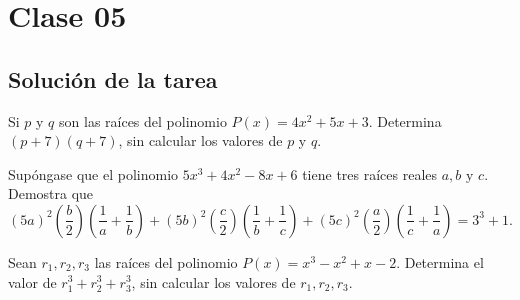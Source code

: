 \section{Clase 05}\label{sec:clase-05}

    \subsection{Solución de la tarea}
    \begin{section-problem}
        Si $p$ y $q$ son las raíces del polinomio $P(x) = 4x^2 + 5x + 3$.
        Determina $(p + 7)(q + 7)$, sin calcular los valores de $p$ y $q$.
    \end{section-problem}

    \begin{section-problem}
        Supóngase que el polinomio $5x^3 + 4x^2 - 8x + 6$ tiene tres raíces reales $a, b \mbox{ y } c$.
        Demostra que \[(5a)^2\left(\frac{b}{2}\right)\left(\frac{1}{a} + \frac{1}{b}\right) + (5b)^2\left(\frac{c}{2}\right)\left(\frac{1}{b} + \frac{1}{c}\right)+ (5c)^2\left(\frac{a}{2}\right)\left(\frac{1}{c} + \frac{1}{a}\right) = 3^3 + 1.\]
    \end{section-problem}

    \begin{section-problem}
        Sean $r_1, r_2, r_3$ las raíces del polinomio $P(x) = x^3 - x^2 + x - 2$.
        Determina el valor de $r^3_1 + r^3_2 + r^3_3$, sin calcular los valores de $r_1, r_2, r_3$.
    \end{section-problem}